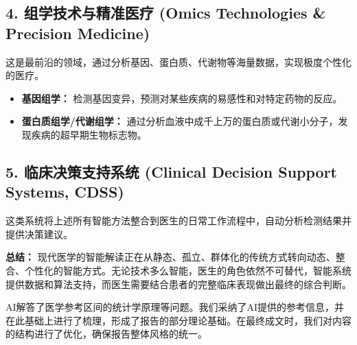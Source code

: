\documentclass[a4paper, oneside, 12pt]{article}
\newcommand{\aisubsection}[1]{%
    \par\smallskip
    \noindent
    \tcbox[
        on line,
        colback=black!20,
        colframe=black!75,
        fontupper=\bfseries,
        boxsep=2pt,
        left=3pt, right=3pt, top=2pt, bottom=2pt,
        arc=2pt
    ]{#1}
    \par\nopagebreak
}
\begin{document}
\begin{aireport}
{    \subsection*{4. 组学技术与精准医疗 (Omics Technologies \& Precision Medicine)}
    这是最前沿的领域，通过分析基因、蛋白质、代谢物等海量数据，实现极度个性化的医疗。
    \begin{itemize}
        \item \textbf{基因组学：} 检测基因变异，预测对某些疾病的易感性和对特定药物的反应。
        \item \textbf{蛋白质组学/代谢组学：} 通过分析血液中成千上万的蛋白质或代谢小分子，发现疾病的超早期生物标志物。
    \end{itemize}

    \subsection*{5. 临床决策支持系统 (Clinical Decision Support Systems, CDSS)}
    这类系统将上述所有智能方法整合到医生的日常工作流程中，自动分析检测结果并提供决策建议。

    \textbf{总结：} 现代医学的智能解读正在从静态、孤立、群体化的传统方式转向动态、整合、个性化的智能方式。无论技术多么智能，医生的角色依然不可替代，智能系统提供数据和算法支持，而医生需要结合患者的完整临床表现做出最终的综合判断。}

    \aisubsection{采纳和人工修改情况}
    AI解答了医学参考区间的统计学原理等问题。我们采纳了AI提供的参考信息，并在此基础上进行了梳理，形成了报告的部分理论基础。在最终成文时，我们对内容的结构进行了优化，确保报告整体风格的统一。
\end{aireport}
\end{document}
